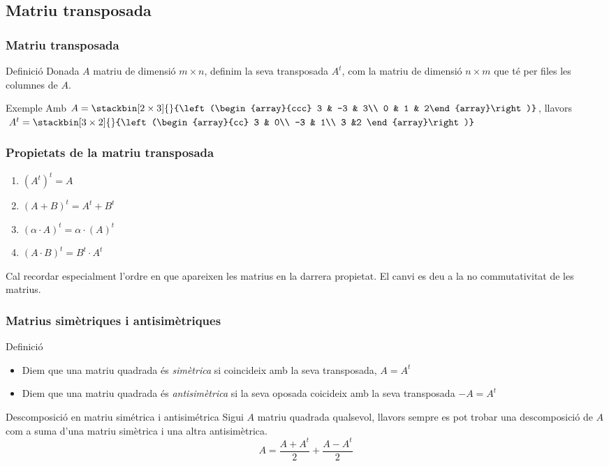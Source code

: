 \documentclass{beamer}
\begin{document}
\subsection{Matriu transposada}
\begin{frame}\frametitle{Matriu transposada}
\begin{block}{Definició}
Donada $A$ matriu de dimensió $m\times n$, definim la seva transposada $A^{t}$, com la matriu de dimensió $n\times m$ que té per files les columnes de $A$.
\end{block}
\begin{exampleblock}{Exemple}
Amb $A=\stackbin[2\times3]{}{\left(\begin{array}{ccc}
3 & -3 & 3\\
0 & 1 & 2\end{array}\right)}$, llavors $\; A^{t}=\stackbin[3\times2]{}{\left(\begin{array}{cc}
3 & 0\\
-3 & 1\\
3 &2 \end{array}\right)}$
\end{exampleblock}
\end{frame}
\begin{frame}\frametitle{Propietats de la matriu transposada}
\begin{enumerate}
\item
 $(A^{t})^{t}=A$
\item
$(A+B)^{t}=A^{t}+B^{t}$
\item
$(\alpha\cdot A)^{t}=\alpha\cdot(A)^{t}$
\item
$(A\cdot B)^{t}=B^{t}\cdot A^{t}$
\end{enumerate}
Cal recordar especialment l'ordre en que apareixen les matrius en la darrera propietat. El canvi es deu a la no commutativitat de les matrius.
\end{frame}
\begin{frame}\frametitle{Matrius simètriques i antisimètriques}
\begin{block}{Definició}
\begin{itemize}
\item
Diem que una matriu quadrada és \emph{simètrica} si coincideix amb la seva transposada, $A=A^{t}$
\item
Diem que una matriu quadrada és \emph{antisimètrica} si la seva oposada coicideix amb la seva transposada $-A=A^{t}$
\end{itemize}
\end{block}
\begin{block}{Descomposició en matriu simétrica i antisimétrica}
Sigui $A$ matriu quadrada qualsevol, llavors sempre es pot trobar una descomposició de $A$ com a suma d'una matriu simètrica i una altra antisimètrica.
$$A=\frac{A+A^{t}}{2}+\frac{A-A^{t}}{2}$$
\end{block}
\end{frame}
\end{document}
